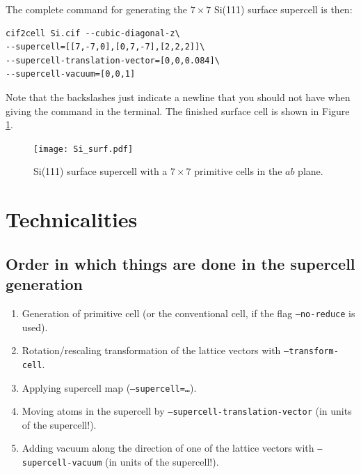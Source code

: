 \documentclass[11pt]{article}
\begin{document}
The complete command for generating the $7\times7$ Si(111) surface supercell is then:
\begin{Verbatim}[fontsize=\small]
cif2cell Si.cif --cubic-diagonal-z\
--supercell=[[7,-7,0],[0,7,-7],[2,2,2]]\
--supercell-translation-vector=[0,0,0.084]\
--supercell-vacuum=[0,0,1]
\end{Verbatim}
Note that the backslashes just indicate a newline that you should not have when giving the command in the terminal. The finished surface cell is shown in Figure \ref{surfSi}.

\begin{figure}[htbp] %
   \centering
   \texttt{[image: Si\_surf.pdf]} 
   \caption{Si(111) surface supercell with a $7\times7$ primitive cells in the $ab$ plane.}
   \label{surfSi}
\end{figure}



\newpage
\appendix
\section{Technicalities}\label{techappendix}

\subsection{Order in which things are done in the supercell generation}
\begin{enumerate}
\item Generation of primitive cell (or the conventional cell, if the flag \texttt{--no-reduce} is used).
\item Rotation/rescaling transformation of the lattice vectors with \texttt{--transform-cell}.
\item Applying supercell map (\texttt{--supercell=\ldots}).
\item Moving atoms in the supercell by \texttt{--supercell-translation-vector} (in units of the supercell!).
\item Adding vacuum along the direction of one of the lattice vectors with \texttt{--supercell-vacuum} (in units of the supercell!).
\end{enumerate}
\end{document}
